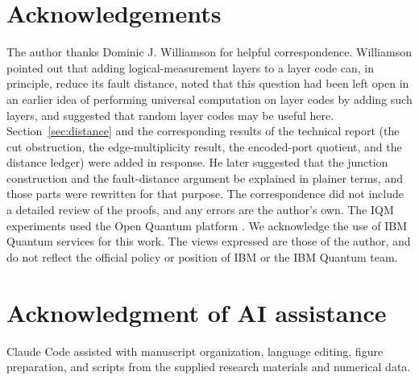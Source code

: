 \documentclass[10pt,a4paper,twocolumn]{article}
\begin{document}
\section*{Acknowledgements}
The author thanks Dominic J. Williamson for helpful correspondence.  Williamson
pointed out that adding logical-measurement layers to a layer code can, in
principle, reduce its fault distance, noted that this question had been left open
in an earlier idea of performing universal computation on layer codes by adding
such layers, and suggested that random layer codes \cite{GuRandomLayerCodes2026}
may be useful here.  Section~\ref{sec:distance} and the corresponding results of
the technical report (the cut obstruction, the edge-multiplicity result, the
encoded-port quotient, and the distance ledger) were added in response.  He later
suggested that the junction construction and the fault-distance argument be
explained in plainer terms, and those parts were rewritten for that purpose.  The
correspondence did not include a detailed review of the proofs, and any errors
are the author's own.  The IQM experiments used the Open Quantum platform
\cite{OpenQuantum2026}.  We acknowledge the use of IBM Quantum services for this
work.  The views expressed are those of the author, and do not reflect the
official policy or position of IBM or the IBM Quantum team.

\section*{Acknowledgment of AI assistance}
Claude Code assisted with manuscript organization, language editing, figure
preparation, and scripts from the supplied research materials and numerical
data.

\renewcommand{\refname}{References}
{\small
\setlength{\itemsep}{0pt}

}
\end{document}

